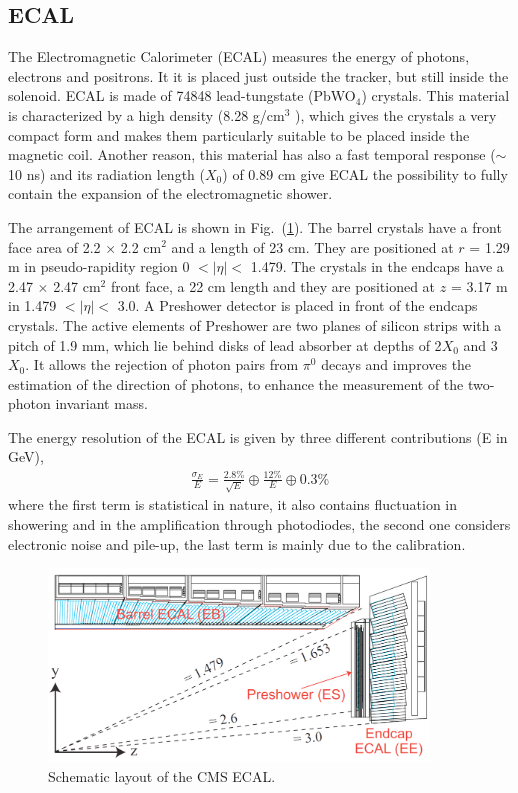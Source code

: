 \subsection{ECAL}

The Electromagnetic Calorimeter (ECAL) measures the energy of photons, electrons and positrons. It it is placed just outside the tracker, but still inside the solenoid. ECAL is made of 74848 lead-tungstate (PbWO$_{4}$) crystals. This material is characterized by a high density (8.28 g/cm$^3$ ), which gives the crystals a very compact form and makes them particularly suitable to be placed inside the magnetic coil. Another reason, this material has also a fast temporal response ($\sim$10 ns) and its radiation length ($X_{0}$) of 0.89 cm give ECAL the possibility to fully contain the expansion of the electromagnetic shower.

The arrangement of ECAL is shown in Fig.~(\ref{fig:ECAL}). The barrel crystals have a front face area of 2.2 $\times$ 2.2 cm$^2$ and a length of 23 cm. They are positioned at $r$ = 1.29 m in pseudo-rapidity region 0 $< |\eta| <$ 1.479. The crystals in the endcaps have a 2.47 $\times$ 2.47 cm$^2$ front face, a 22 cm length and they are positioned at $z$ = 3.17 m in 1.479 $< |\eta| <$ 3.0. A Preshower detector is placed in front of the endcaps crystals. The active elements of Preshower are two planes of silicon strips with a pitch of 1.9 mm, which lie behind disks of lead absorber at depths of 2$X_{0}$ and 3$X_{0}$. It allows the rejection of photon pairs from $\pi^{0}$ decays and improves the estimation of the direction of photons, to enhance the measurement of the two-photon invariant mass.

The energy resolution of the ECAL is given by three different contributions\cite{EcalReso} (E in GeV),
\begin{align}
\frac{\sigma_{E}}{E}=\frac{2.8\%}{\sqrt{E}}\oplus\frac{12\%}{E}\oplus 0.3\%
\end{align}
where the first term is statistical in nature, it also contains fluctuation in showering and in the amplification through photodiodes, the second one considers electronic noise and pile-up, the last term is mainly due to the calibration.

\begin{figure}[hbtp]
  \begin{center}
    \includegraphics[width=0.9\textwidth]{figure/CH2/ECAL.png}
  \end{center}
  \caption{\label{fig:ECAL}Schematic layout of the CMS ECAL.}
\end{figure}

